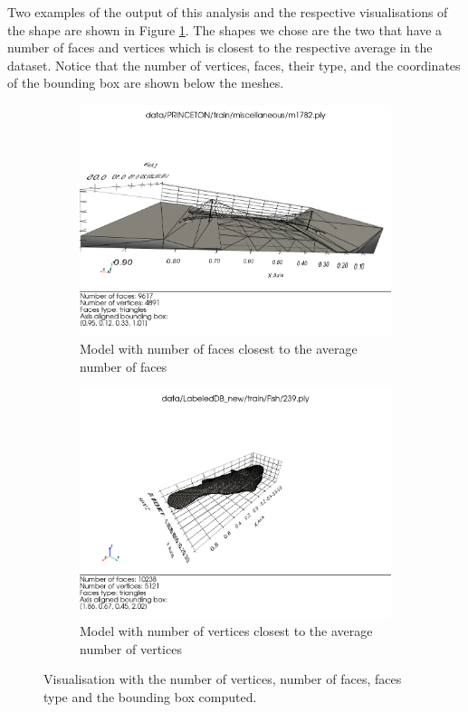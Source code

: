Two examples of the output of this analysis and the respective visualisations of the shape are shown in Figure
\ref{fig:analysed}.
The shapes we chose are the two that have a number of faces and vertices which is closest to the respective average
in the dataset.
Notice that the number of vertices, faces, their type, and the coordinates of the bounding box are shown below the meshes.

\begin{figure}[ht]
    \centering
    \begin{subfigure}{0.45\textwidth}
        \includegraphics[width=\textwidth]
        {assets/visualisation/faces_avg_shape.png}
        \caption{Model with number of faces closest to the average number of faces}
    \end{subfigure}
    \hfill
    \begin{subfigure}{0.45\textwidth}
        \includegraphics[width=\textwidth]
        {assets/visualisation/vertices_avg_shape.png}
        \caption{Model with number of vertices closest to the average number of vertices}
    \end{subfigure}
    \caption{Visualisation with the number of vertices, number of faces, faces type and the bounding box computed.}
    \label{fig:analysed}
\end{figure}

